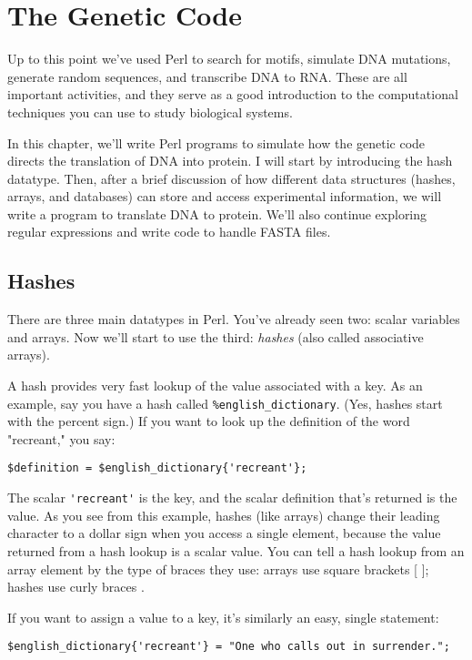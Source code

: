 \chapter{The Genetic Code}
\label{chap:chapter8}
\minitoc

Up to this point we've used Perl to search for motifs, simulate DNA mutations, generate random sequences, and transcribe DNA to RNA. These are all important activities, and they serve as a good introduction to the computational techniques you can use to study biological systems.

In this chapter, we'll write Perl programs to simulate how the genetic code directs the translation of DNA into protein. I will start by introducing the hash datatype. Then, after a brief discussion of how different data structures (hashes, arrays, and databases) can store and access experimental information, we will write a program to translate DNA to protein. We'll also continue exploring regular expressions and write code to handle FASTA files.

\section{Hashes}
There are three main datatypes in Perl. You've already seen two: scalar variables and arrays. Now we'll start to use the third: \textit{hashes} (also called associative arrays).

A hash provides very fast lookup of the value associated with a key. As an example, say you have a hash called \verb|%english_dictionary|. (Yes, hashes start with the percent sign.) If you want to look up the definition of the word "recreant," you say:

\begin{lstlisting}
$definition = $english_dictionary{'recreant'};
\end{lstlisting}

The scalar \verb|'recreant'| is the key, and the scalar definition that's returned is the value. As you see from this example, hashes (like arrays) change their leading character to a dollar sign when you access a single element, because the value returned from a hash lookup is a scalar value. You can tell a hash lookup from an array element by the type of braces they use: arrays use square brackets [ ]; hashes use curly braces { }.

If you want to assign a value to a key, it's similarly an easy, single statement:

\begin{lstlisting}
$english_dictionary{'recreant'} = "One who calls out in surrender.";
\end{lstlisting}

